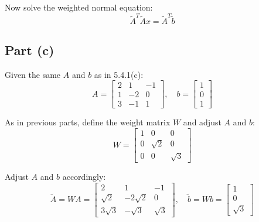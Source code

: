 \documentclass[12pt]{article}
\begin{document}
Now solve the weighted normal equation:
\[
  \tilde{A}^T \tilde{A} x = \tilde{A}^T \tilde{b}
\]

\pagebreak

\subsection*{Part (c)}
Given the same \( A \) and \( b \) as in 5.4.1(c):
\[
  A = \begin{bmatrix} 2 & 1 & -1 \\ 1 & -2 & 0 \\ 3 & -1 & 1 \end{bmatrix}, \quad b = \begin{bmatrix} 1 \\ 0 \\ 1 \end{bmatrix}
\]

As in previous parts, define the weight matrix \( W \) and adjust \( A \) and \( b \):
\[
  W = \begin{bmatrix} 1 & 0 & 0 \\ 0 & \sqrt{2} & 0 \\ 0 & 0 & \sqrt{3} \end{bmatrix}
\]

Adjust \( A \) and \( b \) accordingly:
\[
  \tilde{A} = W A = \begin{bmatrix} 2 & 1 & -1 \\ \sqrt{2} & -2\sqrt{2} & 0 \\ 3\sqrt{3} & -\sqrt{3} & \sqrt{3} \end{bmatrix}, \quad \tilde{b} = W b = \begin{bmatrix} 1 \\ 0 \\ \sqrt{3} \end{bmatrix}
\]
\end{document}
